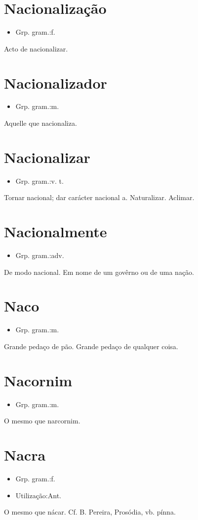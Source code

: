 \section{Nacionalização}
\begin{itemize}
\item {Grp. gram.:f.}
\end{itemize}
Acto de nacionalizar.
\section{Nacionalizador}
\begin{itemize}
\item {Grp. gram.:m.}
\end{itemize}
Aquelle que nacionaliza.
\section{Nacionalizar}
\begin{itemize}
\item {Grp. gram.:v. t.}
\end{itemize}
Tornar nacional; dar carácter nacional a.
Naturalizar.
Aclimar.
\section{Nacionalmente}
\begin{itemize}
\item {Grp. gram.:adv.}
\end{itemize}
De modo nacional.
Em nome de um govêrno ou de uma nação.
\section{Naco}
\begin{itemize}
\item {Grp. gram.:m.}
\end{itemize}
Grande pedaço de pão.
Grande pedaço de qualquer coisa.
\section{Nacornim}
\begin{itemize}
\item {Grp. gram.:m.}
\end{itemize}
O mesmo que \textunderscore narcornim\textunderscore .
\section{Nacra}
\begin{itemize}
\item {Grp. gram.:f.}
\end{itemize}
\begin{itemize}
\item {Utilização:Ant.}
\end{itemize}
O mesmo que \textunderscore nácar\textunderscore . Cf. B. Pereira, \textunderscore Prosódia\textunderscore , vb. \textunderscore pínna\textunderscore .
